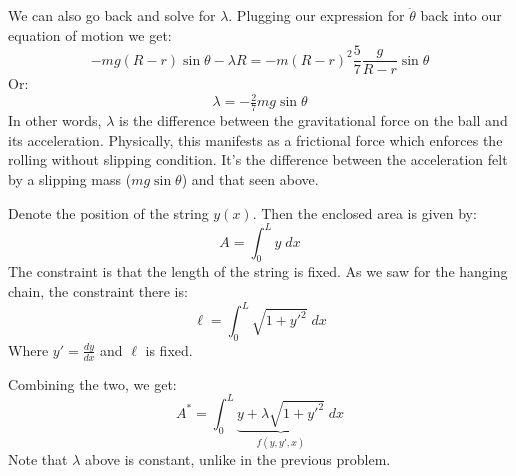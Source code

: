 \documentclass{article}
\begin{document}
{We can also go back and solve for $\lambda$. Plugging our expression for $\ddot{\theta}$ back into our equation of motion we get:
$$
-mg(R-r)\sin\theta - \lambda R = -m (R-r)^2 \frac{5}{7} \frac{ g }{R - r}\sin\theta
$$
Or:
$$
\lambda = -\tfrac{2}{7} m g \sin\theta
$$
In other words, $\lambda$ is the difference between the gravitational force on the ball and its acceleration. Physically, this manifests as a frictional force which enforces the rolling without slipping condition. It's the difference between the acceleration felt by a slipping mass ($mg\sin\theta$) and that seen above.

\newpage

Denote the position of the string $y(x)$. Then the enclosed area is given by:
$$
A = \displaystyle\int_{0}^{L} y \; dx
$$
The constraint is that the length of the string is fixed. As we saw for the hanging chain, the constraint there is:
$$
\ell = \displaystyle\int_{0}^{L} \sqrt{1 + y'^2} \; dx
$$
Where $y' = \tfrac{dy}{dx}$ and  $\ell$ is fixed.

Combining the two, we get:
$$
A^* = \displaystyle\int_{0}^{L} \underbrace{ y + \lambda \sqrt{1 + y'^2} }_{f(y, y', x)}\; dx
$$
Note that $\lambda$ above is constant, unlike in the previous problem.

}
\end{document}
